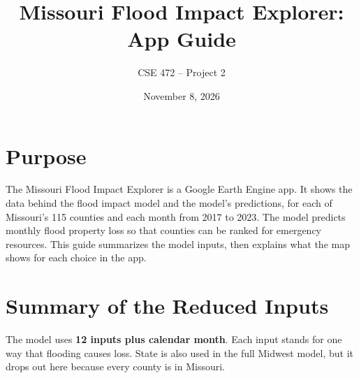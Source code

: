 \documentclass[11pt]{article}
\title{Missouri Flood Impact Explorer: App Guide}
\author{CSE 472 -- Project 2}
\date{November 8, 2026}
\begin{document}
\maketitle

\section*{Purpose}

The Missouri Flood Impact Explorer is a Google Earth Engine app. It shows the data behind the flood
impact model and the model's predictions, for each of Missouri's 115 counties and each month from
2017 to 2023. The model predicts monthly flood property loss so that counties can be ranked for
emergency resources. This guide summarizes the model inputs, then explains what the map shows for
each choice in the app.

\section{Summary of the Reduced Inputs}

The model uses \textbf{12 inputs plus calendar month}. Each input stands for one way that flooding
causes loss. State is also used in the full Midwest model, but it drops out here because every
county is in Missouri.
\end{document}

